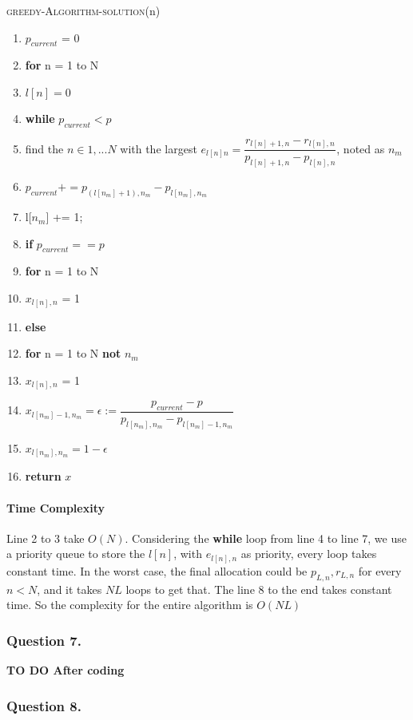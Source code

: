 \documentclass[11pt, oneside]{report}
\begin{document}
\noindent\textsc{greedy-Algorithm-solution}(n)
\begin{enumerate}[1\ ]
\setlength{\topsep}{0.05ex}
\setlength{\itemsep}{0.05ex}
\item $p_{current}$ = 0
\item \textbf{for} n = 1 to N
\item \qquad $l[n] = 0$
\item \textbf{while} $p_{current} < p$
\item \qquad  find the $n \in {1,...N}$ with the largest $e_{l[n]n} = \dfrac{r_{l[n]+1,n} - r_{l[n],n}}{p_{l[n]+1,n} - p_{l[n],n}}$, noted as $n_m$
\item \qquad  $p_{current} += p_{(l[n_{m}] + 1), n_{m}} - p_{l[n_{m}], n_{m}}$
\item \qquad  l[$n_m$] += 1;
\item \textbf{if} $p_{current} == p$
\item \qquad \textbf{for} n = 1 to N
\item \qquad \qquad $x_{l[n],n}$ = 1
\item \textbf{else}
\item \qquad \textbf{for} n = 1 to N \textbf{not} $n_m$
\item \qquad \qquad $x_{l[n],n}$ = 1
\item \qquad $x_{l[n_m] - 1,n_m} = \epsilon := \dfrac{p_{current} - p}{p_{l[n_m],n_m} - p_{l[n_m]-1,n_m}}$
\item \qquad $x_{l[n_m],n_m} = 1 - \epsilon$
\item \textbf{return} $x$
\end{enumerate}

\paragraph{Time Complexity} Line 2 to 3 take $O(N)$. Considering the \textbf{while} loop from line 4 to line 7, we use a priority queue to store the $l[n]$, with $e_{l[n],n}$ as priority, every loop takes constant time. In the worst case, the final allocation could be $p_{L,n}, r_{L,n}$ for every $n < N$, and it takes $NL$ loops to get that. The line 8 to the end  takes constant time. So the complexity for the entire algorithm is $O(NL)$

\subsubsection{Question 7. }
\textbf{ TO DO After coding}

\subsubsection{Question 8. }
\end{document}
